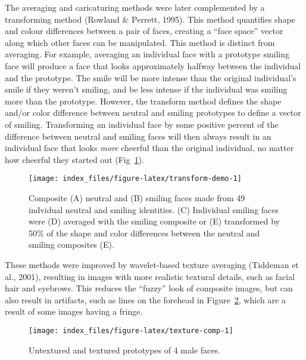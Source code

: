 \documentclass[
  doc,floatsintext]{apa6}
\begin{document}
The averaging and caricaturing methods were later complemented by a transforming method (Rowland \& Perrett, 1995). This method quantifies shape and colour differences between a pair of faces, creating a ``face space'' vector along which other faces can be manipulated. This method is distinct from averaging. For example, averaging an individual face with a prototype smiling face will produce a face that looks approximately halfway between the individual and the prototype. The smile will be more intense than the original individual's smile if they weren't smiling, and be less intense if the individual was smiling more than the prototype. However, the transform method defines the shape and/or color difference between neutral and smiling prototypes to define a vector of smiling. Transforming an individual face by some positive percent of the difference between neutral and smiling faces will then always result in an individual face that looks \emph{more} cheerful than the original individual, no matter how cheerful they started out (Fig~\ref{fig:transform-demo}).



\begin{figure}
\texttt{[image: index\_files/figure-latex/transform-demo-1]} \caption{Composite (A) neutral and (B) smiling faces made from 49 indvidual neutral and smiling identities. (C) Individual smiling faces were (D) averaged with the smiling composite or (E) transformed by 50\% of the shape and color differences between the neutral and smiling composites (E).}\label{fig:transform-demo}
\end{figure}

These methods were improved by wavelet-based texture averaging (Tiddeman et al., 2001), resulting in images with more realistic textural details, such as facial hair and eyebrows. This reduces the ``fuzzy'' look of composite images, but can also result in artifacts, such as lines on the forehead in Figure~\ref{fig:texture-comp}, which are a result of some images having a fringe.

\begin{figure}
\texttt{[image: index\_files/figure-latex/texture-comp-1]} \caption{Untextured and textured prototypes of 4 male faces.}\label{fig:texture-comp}
\end{figure}
\end{document}
